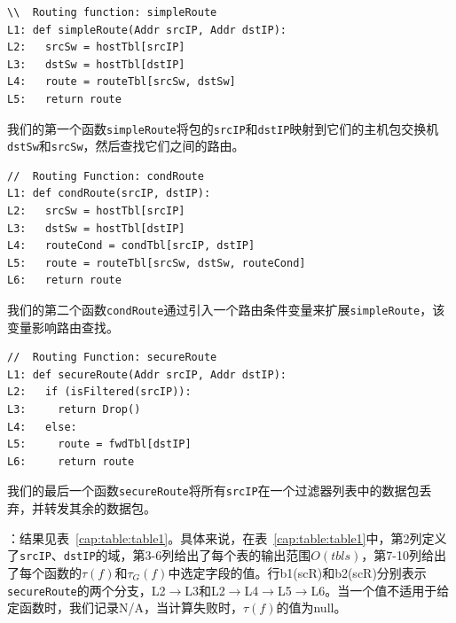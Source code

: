 {\small
\begin{verbatim}
\\  Routing function: simpleRoute
L1: def simpleRoute(Addr srcIP, Addr dstIP):
L2:   srcSw = hostTbl[srcIP]
L3:   dstSw = hostTbl[dstIP]
L4:   route = routeTbl[srcSw, dstSw]
L5:   return route
\end{verbatim}
}

我们的第一个函数\texttt{simpleRoute}将包的\texttt{srcIP}和\texttt{dstIP}映射到它们的主机包交换机\texttt{dstSw}和\texttt{srcSw}，然后查找它们之间的路由。



{\small
\begin{verbatim}
//  Routing Function: condRoute
L1: def condRoute(srcIP, dstIP):
L2:   srcSw = hostTbl[srcIP]
L3:   dstSw = hostTbl[dstIP]
L4:   routeCond = condTbl[srcIP, dstIP]
L5:   route = routeTbl[srcSw, dstSw, routeCond]
L6:   return route
\end{verbatim}
}
我们的第二个函数\texttt{condRoute}通过引入一个路由条件变量来扩展\texttt{simpleRoute}，该变量影响路由查找。


{\small
\begin{verbatim}
//  Routing Function: secureRoute
L1: def secureRoute(Addr srcIP, Addr dstIP):
L2:   if (isFiltered(srcIP)):
L3:     return Drop()
L4:   else:
L5:     route = fwdTbl[dstIP]
L6:     return route
\end{verbatim}
}
我们的最后一个函数\texttt{secureRoute}将所有\texttt{srcIP}在一个过滤器列表中的数据包丢弃，并转发其余的数据包。


：结果见表~\ref{cap:table:table1}。具体来说，在表~\ref{cap:table:table1}中，第2列定义了\texttt{srcIP}、\texttt{dstIP}的域，第3-6列给出了每个表的输出范围$O(tbls)$，第7-10列给出了每个函数的$\tau(f)$和$\tau_G(f)$中选定字段的值。行b1(scR)和b2(scR)分别表示\texttt{secureRoute}的两个分支，L2$\to$L3和L2$\to$L4$\to$L5$\to$L6。当一个值不适用于给定函数时，我们记录N/A，当计算失败时，$\tau(f)$的值为null。


